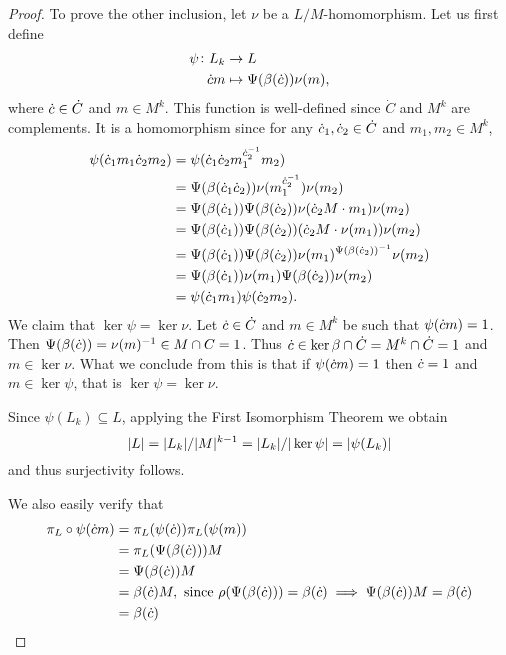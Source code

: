 \begin{proof}
    To prove the other inclusion, let $\nu$ be a $L/M$-homomorphism. 
    Let us first define
    \begin{align*}
        \psi \colon L_k &\rightarrow L \\
                \dot{c} m &\mapsto \Psi(\beta(\dot{c}))\nu(m),
    \end{align*}
    where $\dot{c} \in \dot C$ and $m \in M^k$.
    This function is well-defined since $\dot{C}$ and $M^k$ are complements. It is a homomorphism since for any $\dot{c}_1, \dot{c}_2 \in \dot{C}$ and $m_1, m_2 \in M^k$,
    \begin{align*}
        \psi(\dot{c}_1 m_1 \dot{c}_2 m_2) &= \psi(\dot{c}_1 \dot{c}_2 m_1^{\dot{c}_2^{-1}} m_2) \\
        &= \Psi(\beta(\dot{c}_1 \dot{c}_2)) \nu(m_1^{\dot{c}_2^{-1}}) \nu(m_2) \\
        &= \Psi(\beta(\dot{c}_1)) \Psi(\beta(\dot{c}_2)) \nu(\dot{c}_2M \cdot m_1) \nu(m_2) \\
        &= \Psi(\beta(\dot{c}_1)) \Psi(\beta(\dot{c}_2)) (\dot{c}_2M \cdot \nu(m_1)) \nu(m_2) \\
        &= \Psi(\beta(\dot{c}_1)) \Psi(\beta(\dot{c}_2)) \nu(m_1)^{\Psi(\beta(\dot{c}_2))^{-1}} \nu(m_2) \\
        &= \Psi(\beta(\dot{c}_1)) \nu(m_1) \Psi(\beta(\dot{c}_2)) \nu(m_2) \\
        &= \psi(\dot{c}_1 m_1) \psi(\dot{c}_2 m_2).
    \end{align*}
    We claim that $\ker \psi = \ker \nu$. Let $\dot{c} \in \dot{C}$ and $m \in M^k$ be such that $\psi(\dot{c} m) = 1$. Then
    $\Psi(\beta(\dot{c})) = \nu(m)^{-1} \in M \cap C = 1$. Thus $\dot{c} \in \ker \beta \cap \dot{C} = M^{k} \cap \dot{C} = 1$ and $m \in \ker \nu$. What we conclude from this is that if $\psi(\dot{c} m) = 1$ then $\dot{c} = 1$ and $m \in \ker \psi$, that is $\ker \psi = \ker \nu$.

    Since $\psi(L_k) \subseteq L$, applying the First Isomorphism Theorem we obtain 
    $$
    | L | = | L_k |/| M |^{k-1} = | L_k |/| \ker \psi | = | \psi(L_k) |
    $$ 
    and thus surjectivity follows.
        
    We also easily verify that 
    \begin{align*}
        \pi_L \circ \psi(\dot{c} m) &= \pi_L(\psi(\dot{c}))\pi_L(\psi(m)) \\
        &= \pi_L(\Psi(\beta(\dot{c})))M \\
        &= \Psi(\beta(\dot{c}))M \\
        &= \beta(\dot{c})M, \text{ since $\rho(\Psi(\beta(\dot{c}))) = \beta(\dot{c}) \implies \Psi(\beta(\dot{c}))M = \beta(\dot{c})$} \\
        &= \beta(\dot{c})    
    \end{align*}
    
    \end{proof}


